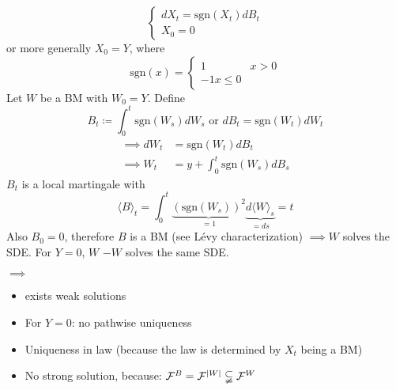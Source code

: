 \begin{example}
    \begin{equation}
        \begin{cases}
            dX_t=\text{sgn}(X_t)dB_t\\
            X_0=0
        \end{cases}
    \end{equation} or more generally $X_0=Y$, where 
    \begin{equation*}
        \text{sgn}(x)=\begin{cases}
            1& x>0\\-1 x\leq 0
        \end{cases}
    \end{equation*}
    Let $W$ be a BM with $W_0=Y$. Define 
    \[B_t\coloneqq \int_0^t\text{sgn}(W_s)dW_s\text{ or } dB_t=\text{sgn}(W_t)dW_t\]
    \begin{align*}
        \implies dW_t &= \text{sgn}(W_t)dB_t \\
        \implies W_t&=y+\int_0^t \text{sgn}(W_s)dB_s
    \end{align*}
    $B_t$ is a local martingale with 
    \[\langle B\rangle_t=\int_0^t \underbrace{(\text{sgn}(W_s))^2}_{=1} \underbrace{d\langle W\rangle_s}_{=ds}=t\]
    Also $B_0=0$, therefore $B$ is a BM (see Lévy characterization) $\implies W$ solves the SDE.
    For $Y=0$, $W$  $-W$ solves the same SDE.

    $\implies$
    \begin{itemize}
        \item  exists weak solutions
        \item For $Y=0$: no pathwise uniqueness
        \item Uniqueness in law (because the law is determined by $X_t$ being a BM)
        \item No strong solution, because: $\mathcal{F}^B=\mathcal{F}^{|W|}\subsetneqq \mathcal{F}^{W}$ 
    \end{itemize}
\end{example}

